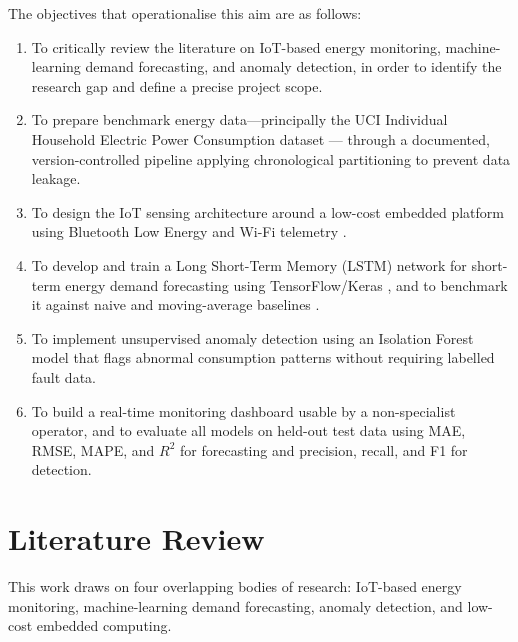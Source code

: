 \documentclass[conference]{IEEEtran}
\begin{document}
\noindent The objectives that operationalise this aim are as follows:
 
\begin{enumerate}
\item To critically review the literature on IoT-based energy monitoring,
machine-learning demand forecasting, and anomaly detection, in order to identify
the research gap and define a precise project scope.
 
\item To prepare benchmark energy data---principally the UCI Individual
Household Electric Power Consumption dataset \cite{hebrail2012individual}---
through a documented, version-controlled pipeline applying chronological
partitioning to prevent data leakage.
 
\item To design the IoT sensing architecture around a low-cost embedded
platform using Bluetooth Low Energy and Wi-Fi telemetry
\cite{munirathinam2020industry,warden2019tinyml}.
 
\item To develop and train a Long Short-Term Memory (LSTM) network
\cite{hochreiter1997long} for short-term energy demand forecasting using
TensorFlow/Keras \cite{abadi2016tensorflow}, and to benchmark it against naive
and moving-average baselines \cite{makridakis2018statistical}.
 
\item To implement unsupervised anomaly detection using an Isolation Forest model
\cite{liu2008isolation} that flags abnormal consumption patterns without
requiring labelled fault data.

\item To build a real-time monitoring dashboard usable by a non-specialist
operator, and to evaluate all models on held-out test data using MAE, RMSE,
MAPE, and $R^2$ for forecasting and precision, recall, and F1 for detection.
 
\end{enumerate}

\section{Literature Review}\label{sec:litreview}
This work draws on four overlapping bodies of research: IoT-based energy
monitoring, machine-learning demand forecasting, anomaly detection, and
low-cost embedded computing.
 
\end{document}
